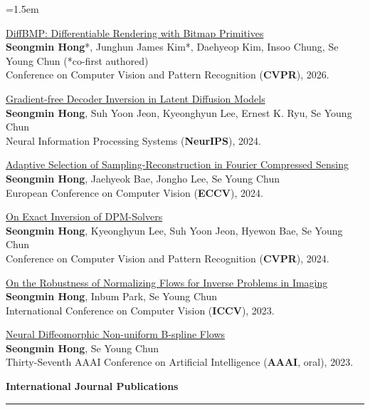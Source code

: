\documentclass[a4paper,11pt]{article}
\newcommand{\sectitle}[1]{
    \vspace{2ex}
    {\Large\textbf{#1}}
    \vspace{0.5ex}
    \hrule
    \vspace{1.5ex}
}
\newenvironment{cvcontent}{
    \begin{list}{}{
        \leftmargin=1.5em %
        \labelwidth=0pt
        \labelsep=0pt
    }\item[]
}{
    \end{list}
}
\begin{document}
\begin{cvcontent}
\href{https://diffbmp.com/}{DiffBMP: Differentiable Rendering with Bitmap Primitives}\\
\textbf{Seongmin Hong}*, Junghun James Kim*, Daehyeop Kim, Insoo Chung, Se Young Chun (*co-first authored)\\
Conference on Computer Vision and Pattern Recognition (\textbf{CVPR}), 2026.

\href{https://smhongok.github.io/dec-inv.html}{Gradient-free Decoder Inversion in Latent Diffusion Models}\\
\textbf{Seongmin Hong}, Suh Yoon Jeon, Kyeonghyun Lee, Ernest K. Ryu, Se Young Chun\\
Neural Information Processing Systems (\textbf{NeurIPS}), 2024.

\href{https://smhongok.github.io/ada-sel.html}{Adaptive Selection of Sampling-Reconstruction in Fourier Compressed Sensing}\\
\textbf{Seongmin Hong}, Jaehyeok Bae, Jongho Lee, Se Young Chun\\
European Conference on Computer Vision (\textbf{ECCV}), 2024.

\href{https://smhongok.github.io/inv-dpm.html}{On Exact Inversion of DPM-Solvers}\\
\textbf{Seongmin Hong}, Kyeonghyun Lee, Suh Yoon Jeon, Hyewon Bae, Se Young Chun\\
Conference on Computer Vision and Pattern Recognition (\textbf{CVPR}), 2024.

\href{https://smhongok.github.io/robustness.html}{On the Robustness of Normalizing Flows for Inverse Problems in Imaging}\\
\textbf{Seongmin Hong}, Inbum Park, Se Young Chun\\
International Conference on Computer Vision (\textbf{ICCV}), 2023.

\href{https://smhongok.github.io/nubsf.html}{Neural Diffeomorphic Non-uniform B-spline Flows}\\
\textbf{Seongmin Hong}, Se Young Chun\\
Thirty-Seventh AAAI Conference on Artificial Intelligence (\textbf{AAAI}, oral), 2023.

\end{cvcontent}
\sectitle{International Journal Publications}
\end{document}
